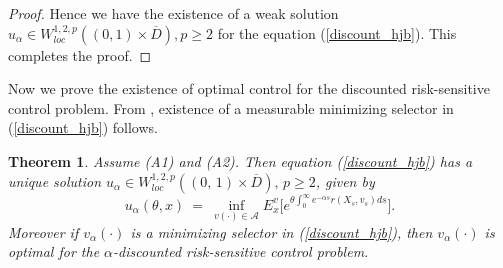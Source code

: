 \documentclass[11pt]{amsart}
\newtheorem{theorem}{\bf Theorem}[section]
\numberwithin{equation}{section}
\begin{document}
\begin{proof}
 Hence we have the existence of a weak solution
$ u_{\alpha} \in W^{1,2,p}_{loc}((0,1)\times  \overline{D}  ), p\geq 2 $ 
for the equation (\ref{discount_hjb}). 
This completes the proof. 
\end{proof} 

Now we prove the existence of optimal  control for the discounted risk-sensitive control problem.
From \cite{Benes}, existence of a measurable minimizing selector in (\ref{discount_hjb})
follows.
\begin{theorem}\label{Thm_discounted_rep} 
 Assume (A1) and (A2). Then equation (\ref{discount_hjb}) has a unique solution 
 $u_{\alpha} \in  W^{1,2,p}_{loc}((0, \, 1) \times \overline{D} ), \, p \geq 2$, 
given by
 \[
u_{\alpha}(\theta, x) \ = \ \inf_{v(\cdot) \in {\mathcal A}} E^v_x \Big[ 
e^{\theta \int^{\infty}_0 e^{- \alpha s}r(X_s, v_s) ds } \Big] .
\]
 Moreover if $v_{\alpha}(\cdot)$ is a minimizing selector in (\ref{discount_hjb}), then $v_{\alpha}(\cdot)$ is optimal for the $\alpha$-discounted 
risk-sensitive  control problem. 
\end{theorem}
\end{document}
